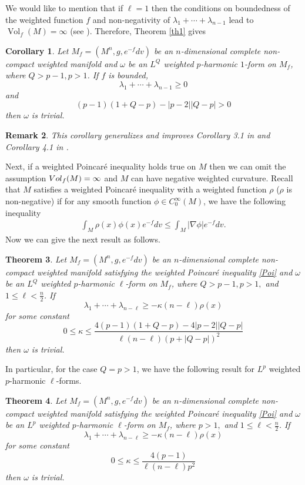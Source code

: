 \documentclass[10pt,a4paper]{amsart}
\newtheorem{theorem}{\indent\sc Theorem}[section]
\newtheorem{corollary}[theorem]{\indent\sc Corollary}
\newtheorem{remark}[theorem]{\indent\sc Remark}
\numberwithin{equation}{section}
\begin{document}
We would like to mention that if $\ell=1$ then the conditions on boundedness of the weighted function $f$ and non-negativity of $\lambda_1+\cdots+\lambda_{n-1}$ lead to $\operatorname{Vol}_f(M)=\infty$ (see \cite{DDH25}). Therefore, Theorem \ref{th1} gives 
\begin{corollary}
	Let $M_f=(M^n,g,e^{-f}dv)$ be an $n$-dimensional complete non-compact weighted manifold  and $\omega$ be an $L^Q$ weighted $p$-harmonic $1$-form on $M_f$, where $Q>p-1,p>1$. 
	If	$f$ is bounded, $$\lambda_1+\cdots+\lambda_{n-1}\ge 0	$$
	and $$(p-1)(1+Q-p)-|p-2||Q-p|>0$$
	then $\omega$ is trivial.
\end{corollary}
\begin{remark}
    This corollary generalizes and improves Corollary 3.1 in \cite{DDH25} and Corollary 4.1 in \cite{VI13}.
\end{remark}
Next, if a weighted Poincar\'e inequality holds true on $M$ then we can omit the assumption $\rm{Vol}_f(M)=\infty$ and $M$ can have negative weighted curvature. Recall that $M$ satisfies a weighted Poincar\'e inequality with a weighted function $\rho$ ($\rho$ is non-negative) if for any smooth function $\phi \in C^{\infty}_0(M)$, we have the following inequality
\begin{align} \label{Poi}
	\int_M \rho(x) \phi(x)e^{-f}dv \le \int_M |\nabla \phi|e^{-f}dv.
\end{align} 
Now we can give the next result as follows.
\begin{theorem}\label{th2}
	Let $M_f=(M^n,g,e^{-f}dv)$ be an $n$-dimensional complete non-compact weighted manifold satisfying the weighted Poincar\'e inequality \eqref{Poi} and $\omega$ be an $L^Q$ weighted $p$-harmonic $\ell$-form on $M_f$, where $Q>p-1,p>1,$ and $1\le \ell < \frac{n}{2}$. 
	If	$$\lambda_1+\cdots+\lambda_{n-\ell}\ge -\kappa(n-\ell)\rho(x)	$$
	for some constant $$0\le \kappa\le \frac{4(p-1)(1+Q-p)-4|p-2||Q-p|}{\ell (n-\ell)(p+|Q-p|)^2}$$
	then $\omega$ is trivial.
\end{theorem}
In particular, for the case $Q=p>1$, we have the following result for $L^p$ weighted $p$-harmonic $\ell$-forms.
\begin{theorem}
	Let $M_f=(M^n,g,e^{-f}dv)$ be an $n$-dimensional complete non-compact weighted manifold satisfying the weighted Poincar\'e inequality \eqref{Poi} and $\omega$ be an $L^p$ weighted $p$-harmonic $\ell$-form on $M_f$, where $p>1,$ and $1\le \ell < \frac{n}{2}$. 
	If	$$\lambda_1+\cdots+\lambda_{n-\ell}\ge -\kappa(n-\ell)\rho(x)	$$
	for some constant $$0\le \kappa\le \frac{4(p-1)}{\ell (n-\ell)p^2}$$
	then $\omega$ is trivial.
\end{theorem}
\end{document}
